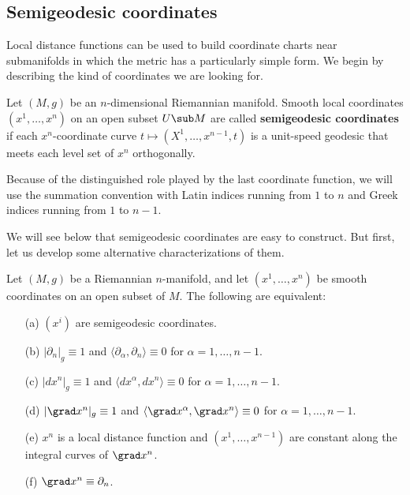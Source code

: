 \subsection{Semigeodesic coordinates}
Local distance functions can be used to build coordinate charts near submanifolds in which the metric has a particularly simple form. We begin by describing the kind of 
coordinates we are looking for.\par
Let $(M,g)$ be an $n$-dimensional Riemannian manifold. Smooth local coordinates $(x^1,\dots,x^n)$ on an open subset $U\sub M$ are called 
\textbf{semigeodesic coordinates} if each $x^n$-coordinate curve $t\mapsto(X^1,\dots,x^{n-1},t)$ is a unit-speed geodesic that meets each level set of $x^n$ orthogonally.\par
Because of the distinguished role played by the last coordinate function, we will use the summation convention with Latin indices running from $1$ to $n$ and Greek 
indices running from $1$ to $n-1$.\par
We will see below that semigeodesic coordinates are easy to construct. But first, let us develop some alternative characterizations of them.
\begin{proposition}\label{Riemann semigeodesic char}
Let $(M,g)$ be a Riemannian $n$-manifold, and let $(x^1,\dots,x^n)$ be smooth coordinates on an open subset of $M$. The following are equivalent:
\begin{itemize}
\item[(a)] $(x^i)$ are semigeodesic coordinates.
\item[(b)] $|\partial_n|_g\equiv 1$ and $\langle\partial_\alpha,\partial_n\rangle\equiv 0$ for $\alpha=1,\dots,n-1$.
\item[(c)] $|dx^n|_g\equiv 1$ and $\langle dx^\alpha,dx^n\rangle\equiv 0$ for $\alpha=1,\dots,n-1$.
\item[(d)] $|\grad x^n|_g\equiv 1$ and $\langle\grad x^\alpha,\grad x^n\rangle\equiv 0$ for $\alpha=1,\dots,n-1$.
\item[(e)] $x^n$ is a local distance function and $(x^1,\dots,x^{n-1})$ are constant along the integral curves of $\grad x^n$.
\item[(f)] $\grad x^n\equiv\partial_n$.
\end{itemize}
\end{proposition}
